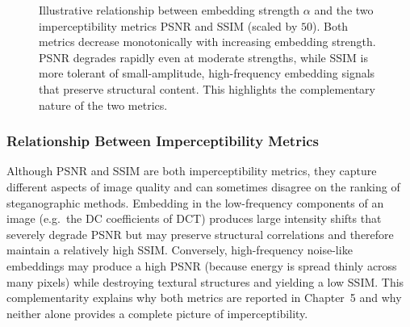 \documentclass[12pt,a4paper,oneside]{report}
\begin{document}
	\begin{figure}[htbp]
		\centering
		\caption{Illustrative relationship between embedding strength $\alpha$ and the two
			imperceptibility metrics PSNR and SSIM (scaled by $50$). Both metrics decrease
			monotonically with increasing embedding strength. PSNR degrades rapidly even at
			moderate strengths, while SSIM is more tolerant of small-amplitude, high-frequency
			embedding signals that preserve structural content. This highlights the
			complementary nature of the two metrics.}
		\label{fig:psnr_ssim_tradeoff}
	\end{figure}
	
	\subsubsection{Relationship Between Imperceptibility Metrics}
	
	Although PSNR and SSIM are both imperceptibility metrics, they capture different aspects of
	image quality and can sometimes disagree on the ranking of steganographic methods. Embedding
	in the low-frequency components of an image (e.g.\ the DC coefficients of DCT) produces large
	intensity shifts that severely degrade PSNR but may preserve structural correlations and
	therefore maintain a relatively high SSIM. Conversely, high-frequency noise-like embeddings
	may produce a high PSNR (because energy is spread thinly across many pixels) while destroying
	textural structures and yielding a low SSIM. This complementarity explains why both metrics
	are reported in Chapter~5 and why neither alone provides a complete picture of imperceptibility.
	
\end{document}
